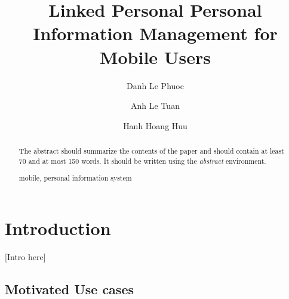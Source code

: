 \documentclass[runningheads,a4paper]{llncs}
\newcommand{\keywords}[1]{\par\addvspace\baselineskip
\noindent\keywordname\enspace\ignorespaces#1}
\begin{document}
\mainmatter  %

\title{Linked Personal Personal Information Management  for Mobile Users}


%
%
\author{Danh Le Phuoc
\and Anh Le Tuan\and Hanh Hoang Huu}
%


%
%

\maketitle


\begin{abstract}
The abstract should summarize the contents of the paper and should
contain at least 70 and at most 150 words. It should be written using the
\emph{abstract} environment.
\keywords{mobile, personal information system}
\end{abstract}


\section{Introduction}
[Intro here]
\subsection{Motivated Use cases}
\end{document}

